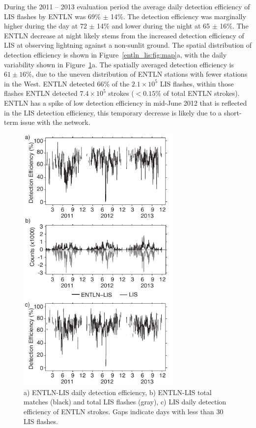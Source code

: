 During the 2011 -- 2013 evaluation period the average daily detection efficiency of LIS flashes by ENTLN was 69\% $\pm$ 14\%.
The detection efficiency was marginally higher during the day at 72 $\pm$ 14\% and lower during the night at 65 $\pm$ 16\%.
The ENTLN decrease at night likely stems from the increased detection efficiency of LIS at observing lightning against a non-sunlit ground.
The spatial distribution of detection efficiency is shown in Figure~\ref{entln_lis:fig:map}a, with the daily variability shown in Figure~\ref{entln_lis:fig:de}a.
The spatially averaged detection efficiency is $61 \pm 16$\%, due to the uneven distribution of ENTLN stations with fewer stations in the West.
ENTLN detected 66\% of the $2.1\times10^5$ LIS flashes, within those flashes ENTLN detected $7.4\times10^5$ strokes ($<0.15$\% of total ENTLN strokes).
ENTLN has a spike of low detection efficiency in mid-June 2012 that is reflected in the LIS detection efficiency, this temporary decrease is likely due to a short-term issue with the network.

\begin{figure}[t]
   \centering
   \noindent\includegraphics[width=19pc,angle=0]{entln_lis/Figures/de.pdf}
   \caption{a) ENTLN-LIS daily detection efficiency,
   		b) ENTLN-LIS total matches (black) and total LIS flashes (gray),
		c) LIS daily detection efficiency of ENTLN strokes.
		Gaps indicate days with less than 30 LIS flashes.
		}
   \label{entln_lis:fig:de}
\end{figure}

